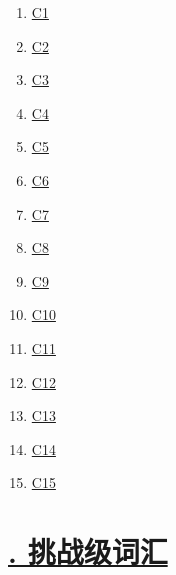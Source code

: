 \documentclass[11pt]{article}
\begin{document}
\begin{multicols}{5}
	\begin{enumerate}
		\item \href{https://mp.weixin.qq.com/s/Doz4bJHWTaih1G1-lTrcsA}{C1}	%
		\item \href{https://mp.weixin.qq.com/s/C62PImjjTqiCjOAj-iPf8A}{C2}	%
		\item \href{https://mp.weixin.qq.com/s/VbifyZMwn0d4cBRQ-Ny2aw}{C3}	%
		\item \href{https://mp.weixin.qq.com/s/WUHqrjggyOfu1OJOWVbpJw}{C4}	%
		\item \href{https://mp.weixin.qq.com/s/BNs0qWXNHS_2jPhVL-ND0Q}{C5}	%
		\item \href{https://mp.weixin.qq.com/s/1HNybLGpDflSixYS1o7xdQ}{C6}	%
		\item \href{https://mp.weixin.qq.com/s/BSX9ZVcntWh-h0zHRQtHxw}{C7}	%
		\item \href{https://mp.weixin.qq.com/s/52mk0CN9E4C9hkJDbZcOxA}{C8}	%
		\item \href{https://mp.weixin.qq.com/s/-A6H3K09FgfwrRNq2Qb7Jw}{C9}	%
		\item \href{https://mp.weixin.qq.com/s/_7nH1fyVvx3uasAo6w5ibQ}{C10}	%
		\item \href{https://mp.weixin.qq.com/s/lmti4hfImFIEKaCIm4SkYA}{C11}	%
		\item \href{https://mp.weixin.qq.com/s/jCYoHKaDgCN-_jPRERRgMQ}{C12}	%
		\item \href{https://mp.weixin.qq.com/s/qL7h9YYokdKKYEjTabuQCg}{C13}	%
		\item \href{https://mp.weixin.qq.com/s/il5aKnCwGG6lOspxHLFc0w}{C14}	%
		\item \href{https://mp.weixin.qq.com/s/iCGXDnPx5skbH9vcvya_6A}{C15}	%
	\end{enumerate}
\end{multicols}



\vspace{-0.5cm}

\section*{\normalfont \large \href{https://www.youtube.com/watch?v=kvj2Pkj12xs&list=PL7aIrlqqP5K-M8Ip7vGkKVK8FhkkliDYz}{. 挑战级词汇} }

\vspace{-0.5cm}
\end{document}
